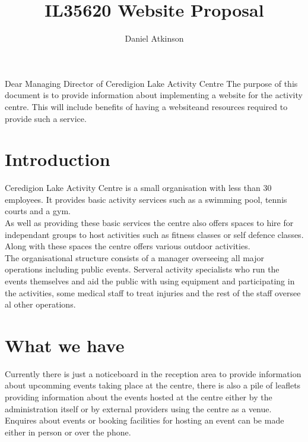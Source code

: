 \documentclass{article}
\begin{document}
\title{IL35620 Website Proposal}

\author{Daniel Atkinson}

\maketitle


\tableofcontents
\newpage
Dear Managing Director of Ceredigion Lake Activity Centre
The purpose of this document is to provide information about implementing a website for the activity centre.  This will include benefits of having a websiteand resources required to provide such a service.

\section{Introduction}
Ceredigion Lake Activity Centre is a small organisation with less than 30 employees.  It provides basic activity services such as a swimming pool, tennis courts and a gym.
\\As well as providing these basic services the centre also offers spaces to hire for independant groups to host activities such as fitness classes or self defence classes.  Along with these spaces the centre offers various outdoor activities.
\\The organisational structure consists of a manager overseeing all major operations including public events.  Serveral activity specialists who run the events themselves and aid the public with using equipment and participating in the activities, some medical staff to treat injuries and the rest of the staff oversee al other operations.
\section{What we have}
Currently there is just a noticeboard in the reception area to provide information about upcomming events taking place at the centre, there is also a pile of leaflets providing information about the events hosted at the centre either by the administration itself or by external providers using the centre as a venue.
\\Enquires about events or booking facilities for hosting an event can be made either in person or over the phone.
\end{document}
